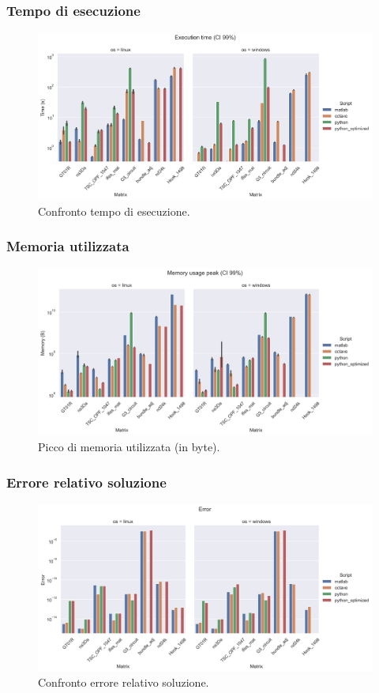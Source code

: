 \documentclass{beamer}
\begin{document}
\begin{frame}
	\frametitle{Tempo di esecuzione}
	\begin{figure}
		\includegraphics[width=1.35\textheight]{assets/execution.jpg}
		\caption{Confronto tempo di esecuzione.}
		\label{fig:execution}
	\end{figure}
\end{frame}

\begin{frame}
	\frametitle{Memoria utilizzata}
	\begin{figure}
		\includegraphics[width=1.35\textheight]{assets/memory.jpg}
		\caption{Picco di memoria utilizzata (in byte).}
		\label{fig:memory}
	\end{figure}
\end{frame}

\begin{frame}
	\frametitle{Errore relativo soluzione}
	\begin{figure}
		\includegraphics[width=1.35\textheight]{assets/error.jpg}
		\caption{Confronto errore relativo soluzione.}
		\label{fig:error}
	\end{figure}
\end{frame}
\end{document}
